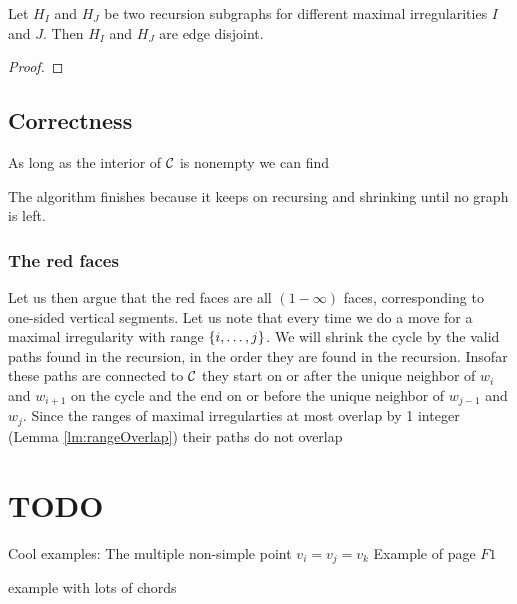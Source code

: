 \begin{lemma}
Let $H_I$ and $H_J$ be two recursion subgraphs for different maximal irregularities $I$ and $J$. Then $H_I$ and $H_J$ are edge disjoint.
\end{lemma}
\begin{proof}
\end{proof}


\subsection{Correctness}
As long as the interior of $\mathcal{C}$ is nonempty we can find

The algorithm finishes because it keeps on recursing and shrinking until no graph is left.

\subsubsection{The red faces}
Let us then argue that the red faces are all $(1-\infty)$ faces, corresponding to one-sided vertical segments.
Let us note that every time we do a move for a maximal irregularity with range $\left\lbrace {i, \ldots, j} \right\rbrace$. We will shrink the cycle by the valid paths found in the recursion, in the order they are found in the recursion. Insofar these paths are connected to $\mathcal{C}$ they start on or after the unique neighbor of $w_i$ and $w_{i+1}$ on the cycle and the end on or before the unique neighbor of $w_{j-1}$ and $w_j$. Since the ranges of maximal irregularties at most overlap by 1 integer (Lemma \ref{lm:rangeOverlap}) their paths do not overlap


\section{TODO}
Cool examples: The multiple non-simple point $v_i = v_j =v_k$
Example of page $F1$

example with lots of chords

